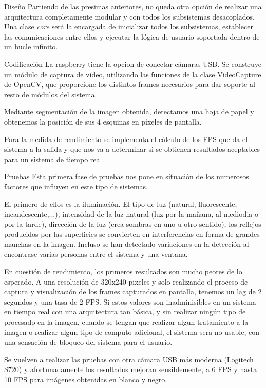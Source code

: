 Diseño 
Partiendo de las presimas anteriores, no queda otra opción de realizar una arquitectura completamente modular y con todos los subsistemas desacoplados. Una clase \emph{core} será la encargada de inicializar todos los subsistemas, establecer las comunicaciones entre ellos y ejecutar la lógica de usuario soportada dentro de un bucle infinito.

Codificación
La raspberry tiene la opcion de conectar cámaras USB. Se construye un módulo de captura de vídeo, utilizando las funciones de la clase VideoCapture de OpenCV, que proporcione los distintos frames necesarios para dar soporte al resto de módulos del sistema. 

Mediante segmentación de la imagen obtenida, detectamos una hoja de papel y obtenemos la posición de sus 4 esquinas en píxeles de pantalla.

Para la medida de rendimiento se implementa el cálculo de los FPS que da el sistema a la salida y que nos va a determinar si se obtienen resultados aceptables para un sistema de tiempo real.

Pruebas
Esta primera fase de pruebas nos pone en situación de los numerosos factores que influyen en este tipo de sistemas.

El primero de ellos es la iluminación. El tipo de luz (natural, fluorescente, incandescente,...), intensidad de la luz natural (luz por la mañana, al mediodia o por la tarde), dirección de la luz (crea sombras en uno u otro sentido), los reflejos producidos por las superficies se convierten en interferencias en forma de grandes manchas en la imagen. Incluso se han detectado variaciones en la detección al encontrase varias personas entre el sistema y una ventana.

En cuestión de rendimiento, los primeros resultados son mucho peores de lo esperado. A una resolución de 320x240 pixeles y solo realizando el proceso de captura y visualización de los frames capturados en pantalla, tenemos un lag de 2 segundos y una tasa de 2 FPS. Si estos valores son inadminisibles en un sistema en tiempo real con una arquitectura tan básica, y sin realizar ningún tipo de procesado en la imagen, cuando se tengan que realizar algun tratamiento a la imagen o realizar algun tipo de computo adicional, el sistema sera no usable, con una sensación de bloqueo del sistema para el usuario.   

Se vuelven a realizar las pruebas con otra cámara USB más moderna (Logitech S720) y afortunadamente los resultados mejoran sensiblemente, a 6 FPS y hasta 10 FPS para imágenes obtenidas en blanco y negro.  

